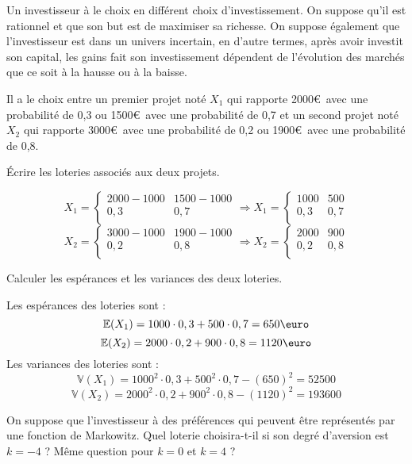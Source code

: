 \documentclass[12pt, a4paper]{exam}
\begin{document}
Un investisseur à le choix en différent choix d'investissement. On suppose qu'il est rationnel et que son but est de maximiser sa richesse. On suppose également que l'investisseur est dans un univers incertain, en d'autre termes, après avoir investit son capital, les gains fait son investissement dépendent de l'évolution des marchés que ce soit à la hausse ou à la baisse. 

Il a le choix entre un premier projet noté  \( X_1 \)  qui rapporte 2000\euro~avec une probabilité de 0,3 ou  1500\euro~avec une probabilité de 0,7 et un second projet noté  \( X_2 \)  qui rapporte 3000\euro~avec une probabilité de 0,2 ou 1900\euro~avec une probabilité de 0,8.

\begin{questions}
\question[1,25] Écrire les loteries associés aux deux projets. 
\end{questions}
\begin{solutionbox}{4cm}
	\[ 
	X_1 =\left\{\begin{matrix}
		2000-1000 & 1500-1000  \\
		0,3 &  0,7\\
	\end{matrix}\right.\Rightarrow 
	X_1 =\left\{\begin{matrix}
		1000 & 500  \\
		0,3 &  0,7\\
	\end{matrix}\right.	
	 \]
	  \[ 
	  X_2 =\left\{\begin{matrix}
	  	3000-1000 & 1900-1000  \\
	  	0,2 &  0,8\\
	  \end{matrix}\right.\Rightarrow 
	   X_2 =\left\{\begin{matrix}
	  	2000 & 900  \\
	  	0,2 &  0,8\\
	  \end{matrix}\right.
	   \]
\end{solutionbox}
\begin{questions}
\question[1,25] Calculer les espérances et les variances des deux loteries.
\end{questions}
\begin{solutionbox}{6cm} Les espérances des loteries sont :
\[ 
\mathbb{E}(X_1)=1000\cdot0,3+500\cdot0,7=650\text{\euro}
 \]
\[ 
\mathbb{E}(X_2)=2000\cdot0,2+900\cdot0,8=1120\text{\euro}
 \] 
Les variances des loteries sont :
\[ 
\mathbb{V}(X_1)=1000^2\cdot0,3+500^2\cdot0,7-(650)^2=52500
 \]
\[ 
\mathbb{V}(X_2)=2000^2\cdot0,2+900^2\cdot0,8-(1120)^2=193600
\]
\end{solutionbox}
\begin{questions}
\question[1,25] On suppose que l'investisseur à des préférences qui peuvent être représentés par une fonction de Markowitz. Quel loterie choisira-t-il si son degré d'aversion est \( k=-4 \) ? Même question pour \( k=0 \)  et  \( k=4 \) ?

\end{questions}
\end{document}
